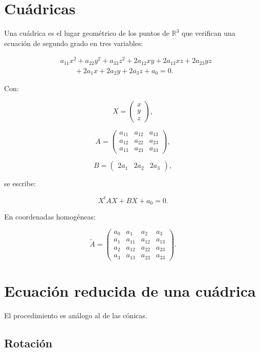 \documentclass[11pt,a4paper]{article}
\newcommand{\R}{\mathbb{R}}
\begin{document}
\section{Cuádricas}

Una cuádrica es el lugar geométrico de los puntos de $\R^3$ que verifican una ecuación de segundo grado en tres variables:

\[
\boxed{
\begin{aligned}
&a_{11}x^2+a_{22}y^2+a_{33}z^2
+2a_{12}xy+2a_{13}xz+2a_{23}yz\\
&\qquad
+2a_1x+2a_2y+2a_3z+a_0=0.
\end{aligned}
}
\]

Con:

\[
X=
\begin{pmatrix}
x\\y\\z
\end{pmatrix},
\]

\[
A=
\begin{pmatrix}
a_{11}&a_{12}&a_{13}\\
a_{12}&a_{22}&a_{23}\\
a_{13}&a_{23}&a_{33}
\end{pmatrix},
\]

\[
B=
\begin{pmatrix}
2a_1&2a_2&2a_3
\end{pmatrix},
\]

se escribe:

\[
\boxed{
X^tAX+BX+a_0=0.
}
\]

En coordenadas homogéneas:

\[
\widetilde A=
\begin{pmatrix}
a_0&a_1&a_2&a_3\\
a_1&a_{11}&a_{12}&a_{13}\\
a_2&a_{12}&a_{22}&a_{23}\\
a_3&a_{13}&a_{23}&a_{33}
\end{pmatrix}.
\]

\section{Ecuación reducida de una cuádrica}

El procedimiento es análogo al de las cónicas.

\subsection{Rotación}
\end{document}
